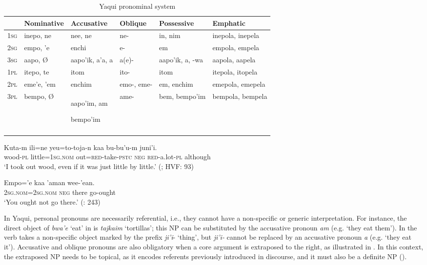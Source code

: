 \documentclass[output=paper]{langscibook}
\begin{document}
\begin{table}

\begin{tabularx}{0.9\textwidth}{p{1cm}p{1.7cm}p{1.7cm}p{1.3cm}p{1.5cm}p{1.5cm}}
\lsptoprule
& {Nominative}  & {Accusative}  & {Oblique} & {Possessive} & {Emphatic}\\
\hline
\textsc{1}\textsc{sg} & {inepo, ne} & {nee, ne} & {ne-} & {in, nim} & {inepola, inepela}\\
\textsc{2}\textsc{sg} & {empo, ’e} & {enchi} & {e-} & {em} & {empola, empela}\\
\textsc{3}\textsc{sg} & {aapo, Ø}  & {aapo’ik, a’a, a} & {a(e)-} & {aapo’ik, a, -wa} & {aapola, aapela}\\
\textsc{1}\textsc{pl} & {itepo, te} & {itom} & {ito-} & {itom} & {itepola, itopela}\\
\textsc{2}\textsc{pl} & {eme’e, ’em} & {enchim} & {emo-, eme-} & {em, enchim} & {emepola, emepela}\\
\textsc{3}\textsc{pl} & {bempo, Ø}  & {aapo’im, am}

{bempo’im} & {ame-} & {bem, bempo’im} & {bempola, bempela}\\
\lspbottomrule
\end{tabularx}
\caption{Yaqui pronominal system}
\label{tab:guerrero:1}
\end{table}


\ea%
    \label{ex:guerrero:6}

\ea
\label{ex:guerrero:6a}
\gll Kuta-m   ili=ne  yeu=to-toja-n   kaa   bu-bu’u-m   juni’i.\\
  wood-\textsc{pl}  little=\textsc{1sg.nom}   out=\textsc{red}{}-take\textsc{-pstc} \textsc{neg}  \textsc{red-}a.lot\textsc{{}-pl} although \\
\glt ‘I took out wood, even if it was just little by little.’ (\citealt{Guerrero2019}; HVF: 93)

\ex
\label{ex:guerrero:6b}
\gll Empo=’e  kaa   ’aman   wee-’ean.\\
    \textsc{2sg.nom=2sg.nom}  \textsc{neg}   there   go-ought\\
\glt ‘You ought not go there.’ (\citealt{DedrickCasad1999}: 243)
\z
\z



In Yaqui, personal pronouns are necessarily referential, i.e., they cannot have a non-specific or generic interpretation. For instance, the direct object of \textit{bwa’e} ‘eat’ in  is \textit{tajkaim} ‘tortillas’; this NP can be substituted by the accusative pronoun \textit{am} (e.g. ‘they eat them’). In  the verb takes a non-specific object marked by the prefix \textit{ji’i}{}- ‘thing’, but \textit{ji’i-} cannot be replaced by an accusative pronoun \textit{a} (e.g. ‘they eat it’). Accusative and oblique pronouns are also obligatory when a core argument is extraposed to the right, as illustrated in . In this context, the extraposed NP needs to be topical, as it encodes referents previously introduced in discourse, and it must also be a definite NP (\citealt{BelloroGuerrero2010}).
\end{document}
